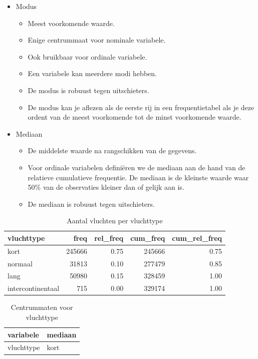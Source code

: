 \documentclass[]{tufte-book}
\providecommand{\tightlist}{%
  \setlength{\itemsep}{0pt}\setlength{\parskip}{0pt}}
\begin{document}
\begin{itemize}
\tightlist
\item
  Modus

  \begin{itemize}
  \tightlist
  \item
    Meest voorkomende waarde.
  \item
    Enige centrummaat voor nominale variabele.
  \item
    Ook bruikbaar voor ordinale variabele.
  \item
    Een variabele kan meerdere modi hebben.
  \item
    De modus is robuust tegen uitschieters.
  \item
    De modus kan je aflezen als de eerste rij in een frequentietabel als je deze ordent van de meest voorkomende tot de minst voorkomende waarde.
  \end{itemize}
\item
  Mediaan

  \begin{itemize}
  \tightlist
  \item
    De middelste waarde na rangschikken van de gegevens.
  \item
    Voor ordinale variabelen definiëren we de mediaan aan de hand van de relatieve cumulatieve frequentie. De mediaan is de kleinste waarde waar 50\% van de observaties kleiner dan of gelijk aan is.
  \item
    De mediaan is robuust tegen uitschieters.
  \end{itemize}
\end{itemize}

\begin{table}

\caption{\label{tab:4-5}Aantal vluchten per vluchttype}
\centering
\fontsize{10}{12}\selectfont
\begin{tabular}[t]{lrrrr}
\toprule
vluchttype & freq & rel\_freq & cum\_freq & cum\_rel\_freq\\
\midrule
kort & 245666 & 0.75 & 245666 & 0.75\\
normaal & 31813 & 0.10 & 277479 & 0.85\\
lang & 50980 & 0.15 & 328459 & 1.00\\
intercontinentaal & 715 & 0.00 & 329174 & 1.00\\
\bottomrule
\end{tabular}
\end{table}
\begin{table}

\caption{\label{tab:4-6}Centrummaten voor vluchttype}
\centering
\fontsize{10}{12}\selectfont
\begin{tabular}[t]{ll}
\toprule
variabele & mediaan\\
\midrule
vluchttype & kort\\
\bottomrule
\end{tabular}
\end{table}
\end{document}
